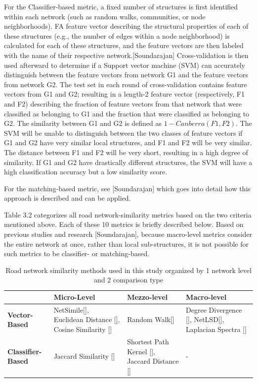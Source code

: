 For the Classifier-based metric,  a fixed number of structures is first identified within each network (such as random walks, communities, or node neighborhoods). FA feature vector describing the structural properties of each of these structures (e.g., the number of edges within a node neighborhood) is calculated for each of these structures, and the feature vectors are then labeled with the name of their respective network.[Soundarajan] Cross-validation is then used afterward to determine if a Support vector machine (SVM) can accurately distinguish between the feature vectors from network G1 and the feature vectors from network G2. The test set in each round of cross-validation contains feature vectors from G1 and G2; resulting in a length-2 feature vector (respectively, F1 and F2) describing the fraction of feature vectors from that network that were classified as belonging to G1 and the fraction that were classified as belonging to G2. The similarity between G1 and G2 is defined as $1-Canberra(F1, F2)$. The SVM will be unable to distinguish between the two classes of feature vectors if G1 and G2 have very similar local structures, and F1 and F2 will be very similar. The distance between F1 and F2 will be very short, resulting in a high degree of similarity. If G1 and G2 have drastically different structures, the SVM will have a high classification accuracy but a low similarity score.

For the matching-based metric, see [Soundarajan] which goes into detail how this approach is described and can be applied. 

Table 3.2 categorizes all road network-similarity metrics based on the two criteria mentioned above. Each of these 10 metrics is briefly described below. Based on previous studies and research [Soundarajan], because macro-level metrics consider the entire network at once, rather than local sub-structures, it is not possible for such metrics to be classifier- or matching-based.

\begin{table}[!h]
\centering
\begin{tabular}{ |p{3cm}|p{3cm}|p{3cm}| p{3cm} | }
\hline
& \textbf{Micro-Level} & \textbf{Mezzo-level} & \textbf{Macro-level} \\ \hline
\textbf{Vector-Based} & NetSimile[], Euclidean Distance [], Cosine Similarity [] & Random Walk[] & Degree Divergence [], NetLSD[], Laplacian Spectra [] \\ \hline
\textbf{Classifier-Based} & Jaccard Similarity [] & Shortest Path Kernel [], Jaccard Distance [] & - \\ \hline
\end{tabular}
\caption{Road network similarity methods used in this study organized by 1 network level and 2 comparison type}
\label{tab:Road Network Similarity Methods}
\end{table}

